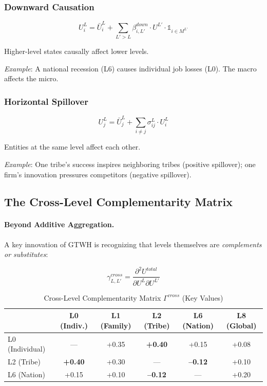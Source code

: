 \subsubsection{Downward Causation}

\begin{equation}
U^L_i = \bar{U}^L_i + \sum_{L' > L} \beta^{down}_{i,L'} \cdot U^{L'} \cdot \mathbb{1}_{i \in M^{L'}}
\end{equation}

Higher-level states causally affect lower levels.

\textit{Example}: A national recession (L6) causes individual job losses (L0). 
The macro affects the micro.

\subsubsection{Horizontal Spillover}

\begin{equation}
U^L_j = \bar{U}^L_j + \sum_{i \neq j} \sigma^L_{ij} \cdot U^L_i
\end{equation}

Entities at the same level affect each other.

\textit{Example}: One tribe's success inspires neighboring tribes (positive spillover); 
one firm's innovation pressures competitors (negative spillover).

\subsection{The Cross-Level Complementarity Matrix}

\paragraph{Beyond Additive Aggregation.}
A key innovation of GTWH is recognizing that levels themselves are 
\textit{complements or substitutes}:

\begin{equation}
\gamma^{cross}_{L,L'} = \frac{\partial^2 U^{total}}{\partial U^L \partial U^{L'}}
\end{equation}

\begin{table}[htbp]
\centering
\caption{Cross-Level Complementarity Matrix $\Gamma^{cross}$ (Key Values)}
\label{tab:gtwh-gamma-cross}
\renewcommand{\arraystretch}{1.3}
\begin{tabular}{@{}lccccc@{}}
\toprule
& L0 (Indiv.) & L1 (Family) & L2 (Tribe) & L6 (Nation) & L8 (Global) \\
\midrule
L0 (Individual) & --- & +0.35 & \textbf{+0.40} & +0.15 & +0.08 \\
L2 (Tribe) & \textbf{+0.40} & +0.30 & --- & \textbf{--0.12} & +0.10 \\
L6 (Nation) & +0.15 & +0.10 & \textbf{--0.12} & --- & +0.20 \\
\bottomrule
\end{tabular}
\end{table}

